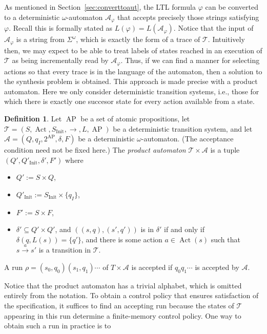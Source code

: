 \documentclass{amsart}
\DeclareMathOperator{\Act}{Act}
\DeclareMathOperator{\ap}{AP}
\theoremstyle{plain}
\theoremstyle{definition}
\newtheorem{defn}{Definition}
\theoremstyle{definition}
\begin{document}
As mentioned in Section~\ref{sec:converttoaut}, the LTL formula $\varphi$ can be
converted to a deterministic $\omega$-automaton $\mathcal{A}_{\varphi}$ that
accepts precisely those strings satisfying $\varphi$.  Recall this is formally
stated as $L(\varphi)=L(\mathcal{A}_{\varphi})$.  Notice that the input of
$\mathcal{A}_{\varphi}$ is a string from $\Sigma^{\omega}$, which is exactly the
form of a trace of $\mathcal{T}$.  Intuitively then, we may expect to be able to treat
labels of states reached in an execution of $\mathcal{T}$ as being incrementally read by
$\mathcal{A}_{\varphi}$.  Thus, if we can find a manner for selecting actions so
that every trace is in the language of the automaton, then a solution to the
synthesis problem is obtained.  This approach is made precise with a product
automaton.  Here we only consider deterministic transition systems, i.e., those
for which there is exactly one succesor state for every action available from a state.
\begin{defn}
Let $\ap$ be a set of atomic propositions, let $\mathcal{T}=(S,\Act, S_{\mathrm{Init}}, \longrightarrow, L, \ap)$ be a deterministic transition system, and let $\mathcal{A}=( Q, q_I, 2^{\ap}, \delta, F )$ be a deterministic $\omega$-automaton.  (The acceptance condition need not be fixed here.)  The \textit{product automaton} $\mathcal{T}\times \mathcal{A}$ is a tuple $\left(Q', Q'_{\mathrm{Init}}, \delta' , F' \right)$ where
\begin{itemize}
\item $Q' := S\times Q$,
\item $Q'_{\mathrm{Init}} := S_{\mathrm{Init}}\times \{ q_I \}$,
\item $F' := S\times F$,
\item $\delta' \subseteq Q' \times Q'$, and $\left( (s,q), (s',q') \right)$ is in $\delta'$ if and only if $\delta(q, L(s)) = \{ q' \}$, and there is some action $a\in\Act(s)$ such that $s\overset{a}{\longrightarrow}s'$ is a transition in $\mathcal{T}$.
\end{itemize}
A run $\rho=(s_0 , q_0 ) (s_1 , q_1 ) \cdots$ of $T\times \mathcal{A}$ is accepted if $q_0 q_1 \cdots$ is accepted by $\mathcal{A}$.
\end{defn}
Notice that the product automaton has a trivial alphabet, which is omitted
entirely from the notation.  To obtain a control policy that ensures
satisfaction of the specification, it suffices to find an accepting run because
the states of $\mathcal{T}$ appearing in this run determine a finite-memory control
policy.  One way to obtain such a run in practice is to
\end{document}
